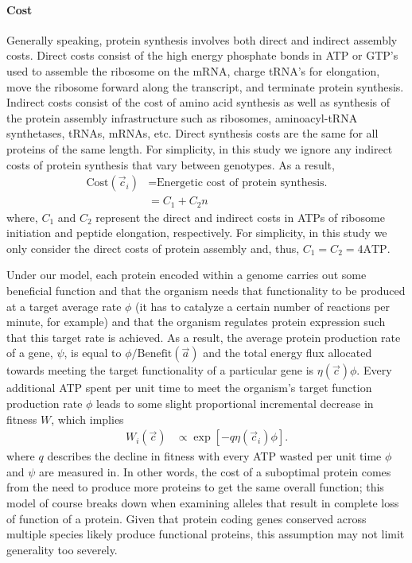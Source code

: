 \documentclass{article}
\newcommand{\cvec}{\ensuremath{\Vec{c}}\xspace}
\newcommand{\cveci}{\ensuremath{\cvec_i}\xspace}
\newcommand{\avec}{\ensuremath{\Vec{a}}\xspace}
\newcommand{\Costcveci}{\ensuremath{\text{Cost}(\cveci)}\xspace}
\newcommand{\Func}{\ensuremath{\text{Benefit}}\xspace}
\begin{document}
\paragraph*{Cost}
Generally speaking, protein synthesis involves both direct and indirect assembly costs.
Direct costs consist of the high energy phosphate bonds in ATP or GTP's used to assemble the ribosome on the mRNA, charge tRNA's for elongation, move the ribosome forward along the transcript, and terminate protein synthesis.
Indirect costs consist of the cost of amino acid synthesis as well as synthesis of the protein assembly infrastructure such as ribosomes, aminoacyl-tRNA synthetases, tRNAs, mRNAs, etc.
Direct synthesis costs are the same for all proteins of the same length.
For simplicity, in this study we ignore any indirect costs of protein synthesis that vary between genotypes.
As a result, 
\begin{align}
\label{eq:defineCost}
  \Costcveci  &= \text{Energetic cost of protein synthesis.}\\
  &= C_1 + C_2 n
\end{align}
where, $C_1$ and $C_2$ represent the direct and indirect costs in ATPs of ribosome initiation and peptide elongation, respectively.
For simplicity, in this study we only consider the direct costs of protein assembly and, thus, $C_1 = C_2 = 4 \text{ATP}$.

Under our model, each protein encoded within a genome carries out some beneficial function and that the organism needs that functionality to be produced at a target average rate $\phi$ (it has to catalyze a certain number of reactions per minute, for example) and that the organism regulates protein expression such that this target rate is achieved. 
As a result, the average protein production rate of a gene, $\psi$, is equal to $\phi/\Func(\avec)$ and the total energy flux allocated towards meeting the target functionality of a particular gene is $\eta(\cvec) \phi$. 
Every additional ATP spent per unit time to meet the organism's target function production rate $\phi$ leads to some slight proportional incremental decrease in fitness $W$, which implies 
\begin{align}
  W_i\left(\cvec\right) &\propto \exp\left[- q \eta(\cveci) \phi\right].
\end{align}
where $q$ describes the decline in fitness with every ATP wasted per unit time $\phi$ and $\psi$ are measured in.
In other words, the cost of a suboptimal protein comes from the need to produce more proteins to get the same overall function; this model of course breaks down when examining alleles that result in complete loss of function of a protein.
Given that protein coding genes conserved across multiple species likely produce functional proteins, this assumption may not limit generality too severely.
\end{document}
